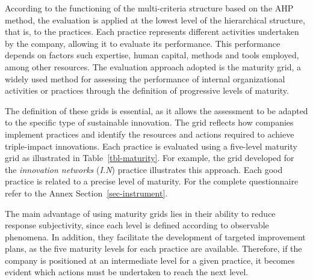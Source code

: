 \documentclass[
  12pt,
  oneside]{book}
\begin{document}
According to the functioning of the multi-criteria structure based on
the AHP method, the evaluation is applied at the lowest level of the
hierarchical structure, that is, to the practices. Each practice
represents different activities undertaken by the company, allowing it
to evaluate its performance. This performance depends on factors such
expertise, human capital, methods and tools employed, among other
resources. The evaluation approach adopted is the maturity grid, a
widely used method for assessing the performance of internal
organizational activities or practices through the definition of
progressive levels of maturity.

The definition of these grids is essential, as it allows the assessment
to be adapted to the specific type of sustainable innovation. The grid
reflects how companies implement practices and identify the resources
and actions required to achieve triple-impact innovations. Each practice
is evaluated using a five-level maturity grid as illustrated in
Table~\ref{tbl-maturity}. For example, the grid developed for the
\emph{innovation networks} (\emph{I.N}) practice illustrates this
approach. Each good practice is related to a precise level of maturity.
For the complete questionnaire refer to the Annex
Section~\ref{sec-instrument}.

The main advantage of using maturity grids lies in their ability to
reduce response subjectivity, since each level is defined according to
observable phenomena. In addition, they facilitate the development of
targeted improvement plans, as the five maturity levels for each
practice are available. Therefore, if the company is positioned at an
intermediate level for a given practice, it becomes evident which
actions must be undertaken to reach the next level.
\end{document}

